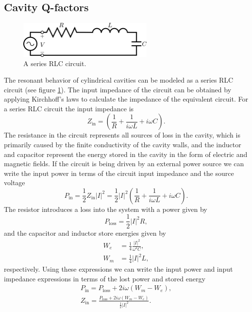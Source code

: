 \subsection{Cavity Q-factors}

\begin{figure}[htbp]
    \centering
    \includegraphics*[width=0.6\textwidth]{figs/Chapter-6/230607_rlc.png}
    \caption{\label{fig:chap6-series-rlc} A series RLC circuit.}
\end{figure}

The resonant behavior of cylindrical cavities can be modeled as a series RLC circuit (see figure \ref{fig:chap6-series-rlc}). The input impedance of the circuit can be obtained by applying Kirchhoff's laws to calculate the impedance of the equivalent circuit. For a series RLC circuit the input impedance is 
\begin{equation}
    Z_\mathrm{in}=\left(\frac{1}{R}+\frac{1}{i\omega L}+i\omega C\right).
\end{equation}
The resistance in the circuit represents all sources of loss in the cavity, which is primarily caused by the finite conductivity of the cavity walls, and the inductor and capacitor represent the energy stored in the cavity in the form of electric and magnetic fields. If the circuit is being driven by an external power source we can write the input power in terms of the circuit input impedance and the source voltage 
\begin{equation}
    P_\mathrm{in} = \frac{1}{2}Z_\mathrm{in}|I|^2=\frac{1}{2}|I|^2\left(\frac{1}{R}+\frac{1}{i\omega L}+i\omega C\right).
\end{equation} 
The resistor introduces a loss into the system with a power given by 
\begin{equation}
    P_\mathrm{loss} = \frac{1}{2}|I|^2R,
\end{equation}
and the capacitor and inductor store energies given by
\begin{align}
    W_e&=\frac{1}{4}\frac{|I|^2}{\omega^2 C},\\
    W_m&=\frac{1}{4}|I|^2 L,
\end{align}
respectively. Using these expressions we can write the input power and input impedance expressions in terms of the lost power and stored energy 
\begin{align}
    P_\mathrm{in}=P_\mathrm{loss}+2i\omega(W_m-W_e),\\
    Z_\mathrm{in}=\frac{P_\mathrm{loss}+2i\omega(W_m-W_e)}{\frac{1}{2}|I|^2}.
\end{align}

